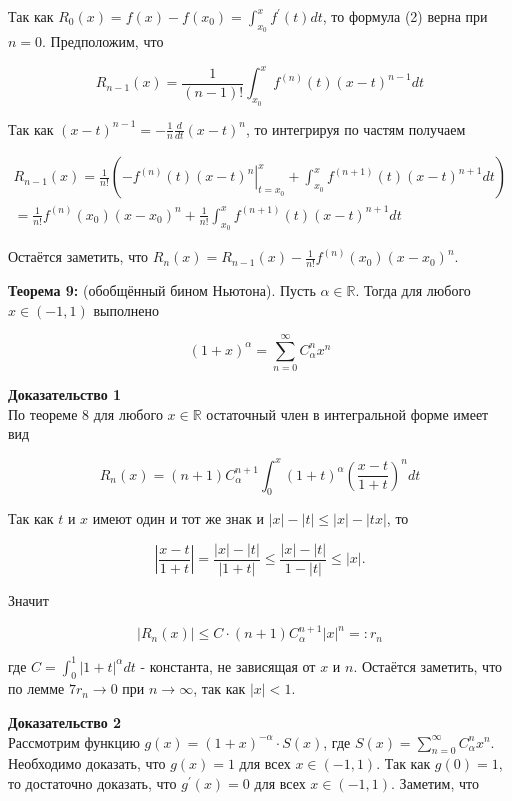 \documentclass[a4paper,12pt]{article} %
\begin{document}
Так как $R_{0}(x)=f(x)-f\left(x_{0}\right)=\int_{x_{0}}^{x} f^{\prime}(t) d t$, то формула (2) верна при $n=0$. Предположим, что

$$
R_{n-1}(x)=\frac{1}{(n-1) !} \int_{x_{0}}^{x} f^{(n)}(t)(x-t)^{n-1} d t
$$

Так как $(x-t)^{n-1}=-\frac{1}{n} \frac{d}{d t}(x-t)^{n}$, то интегрируя по частям получаем

$$
\begin{gathered}
R_{n-1}(x)=\frac{1}{n !}\left(-\left.f^{(n)}(t)(x-t)^{n}\right|_{t=x_{0}} ^{x}+\int_{x_{0}}^{x} f^{(n+1)}(t)(x-t)^{n+1} d t\right) \\
=\frac{1}{n !} f^{(n)}\left(x_{0}\right)\left(x-x_{0}\right)^{n}+\frac{1}{n !} \int_{x_{0}}^{x} f^{(n+1)}(t)(x-t)^{n+1} d t
\end{gathered}
$$

Остаётся заметить, что $R_{n}(x)=R_{n-1}(x)-\frac{1}{n !} f^{(n)}\left(x_{0}\right)\left(x-x_{0}\right)^{n}$.

\textbf{Теорема 9:} (обобщённый бином Ньютона). Пусть $\alpha \in \mathbb{R}$. Тогда для любого $x \in(-1,1)$ выполнено

$$
(1+x)^{\alpha}=\sum_{n=0}^{\infty} C_{\alpha}^{n} x^{n}
$$

\textbf{Доказательство 1}\\
По теореме 8 для любого $x \in \mathbb{R}$ остаточный член в интегральной форме имеет вид

$$
R_{n}(x)=(n+1) C_{\alpha}^{n+1} \int_{0}^{x}(1+t)^{\alpha}\left(\frac{x-t}{1+t}\right)^{n} d t
$$

Так как $t$ и $x$ имеют один и тот же знак и $|x|-|t| \leq|x|-|t x|$, то

$$
\left|\frac{x-t}{1+t}\right|=\frac{|x|-|t|}{|1+t|} \leq \frac{|x|-|t|}{1-|t|} \leq|x| .
$$

Значит

$$
\left|R_{n}(x)\right| \leq C \cdot(n+1) C_{\alpha}^{n+1}|x|^{n}=: r_{n}
$$

где $C=\int_{0}^{1}|1+t|^{\alpha} d t$ - константа, не зависящая от $x$ и $n$. Остаётся заметить, что по лемме $7 r_{n} \rightarrow 0$ при $n \rightarrow \infty$, так как $|x|<1$.

\textbf{Доказательство 2}\\

Рассмотрим функцию $g(x)=(1+x)^{-\alpha} \cdot S(x)$, где $S(x)=\sum_{n=0}^{\infty} C_{\alpha}^{n} x^{n}$. Необходимо доказать, что $g(x)=1$ для всех $x \in(-1,1)$. Так как $g(0)=1$, то достаточно доказать, что $g^{\prime}(x)=0$ для всех $x \in(-1,1)$. Заметим, что
\end{document}
